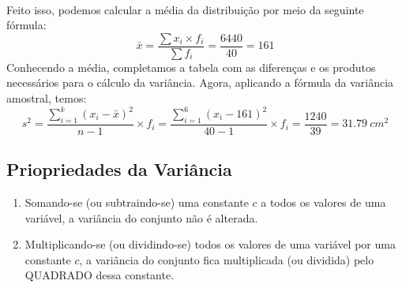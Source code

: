 \begin{example}
\begin{table}[H]
\begin{tabular}{lcccccc}
\end{tabular}
\caption{}
\label{tab:desv_pad}
\end{table}
Feito isso, podemos calcular a média da distribuição por meio da seguinte fórmula:
\[
    \bar{x}=\frac{\sum x_i\times f_i}{\sum f_i}=\frac{6440}{40}=161
\]
Conhecendo a média, completamos a tabela com as diferenças e os produtos necessários para o cálculo da variância. Agora, aplicando a fórmula da variância amostral, temos:
\[
    s^2=\frac{\sum_{i=1}^{k}(x_i-\bar{x})^2}{n-1}\times f_i
    = \frac{\sum_{i=1}^{6}(x_i-161)^2}{40-1}\times f_i
    =\frac{1240}{39}=\SI{31,79}{cm^2}
\]
\end{example}

\subsection{Priopriedades da Variância}

\begin{enumerate}
    \item Somando-se (ou subtraindo-se) uma constante $c$ a todos os valores de uma variável, a variância do conjunto não é alterada.
    \item Multiplicando-se (ou dividindo-se) todos os valores de uma variável por uma constante $c$, a variância do conjunto fica multiplicada (ou dividida) pelo QUADRADO dessa constante.
\end{enumerate}